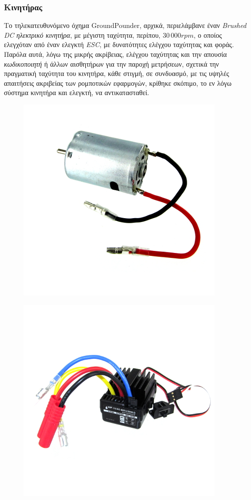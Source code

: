 \bigskip
\subsubsection{Κινητήρας} \label{sssec:motor}
Το τηλεκατευθυνόμενο όχημα GroundPounder, αρχικά, περιελάμβανε έναν \textit{Brushed DC ηλεκτρικό κινητήρα}, με μέγιστη ταχύτητα, περίπου, $30\,000rpm$, ο οποίος ελεγχόταν από έναν ελεγκτή \textit{ESC}, με δυνατότητες ελέγχου ταχύτητας και φοράς. Παρόλα αυτά, λόγω της μικρής ακρίβειας, ελέγχου ταχύτητας και την απουσία \textit{κωδικοποιητή} ή άλλων αισθητήρων για την παροχή μετρήσεων, σχετικά την πραγματική ταχύτητα του κινητήρα, κάθε στιγμή, σε συνδυασμό, με τις υψηλές απαιτήσεις ακριβείας των ρομποτικών εφαρμογών, κρίθηκε σκόπιμο, το εν λόγω σύστημα κινητήρα και ελεγκτή, να αντικατασταθεί.

\begin{figure}[!ht]
	\begin{minipage}{.49\textwidth}
 	\centering
		\includegraphics[width=0.6\linewidth]{Chapters/Chapter2/Figures/original_motor.jpg}
		\label{fig:original_motor}
	\end{minipage}
	\begin{minipage}{.5\textwidth}		
		\centering
		\includegraphics[width=0.6\linewidth]{Chapters/Chapter2/Figures/esc.jpg}
		\label{fig:esc}
	\end{minipage}
\end{figure}

